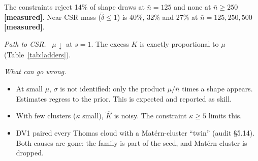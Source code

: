 \documentclass[10pt,a4paper]{article}
\newcommand{\measured}{\textcolor{green!45!black}{\textbf{[measured]}}}
\newcommand{\nbar}{\bar n}
\newcommand{\dtil}{\tilde\delta}
\newcommand{\sub}[1]{\par\textit{#1}\ }
\begin{document}
The constraints reject 14\% of shape draws at $\nbar=125$ and none at $\nbar\ge250$ \measured. Near-CSR mass ($\dtil\le1$) is 40\%, 32\% and 27\% at $\nbar=125,250,500$ \measured.
\sub{Path to CSR.} $\mu\downarrow$ at $s=1$. The excess $K$ is exactly proportional to $\mu$ (Table~\ref{tab:ladders}).
\sub{What can go wrong.}
\begin{itemize}
  \item At small $\mu$, $\sigma$ is not identified: only the product $\mu/\nbar$ times a shape appears. Estimates regress to the prior. This is expected and reported as skill.
  \item With few clusters ($\kappa$ small), $\hat K$ is noisy. The constraint $\kappa\ge5$ limits this.
  \item DV1 paired every Thomas cloud with a Mat\'ern-cluster ``twin'' (audit \S5.14). Both causes are gone: the family is part of the seed, and Mat\'ern cluster is dropped.
\end{itemize}
\end{document}
